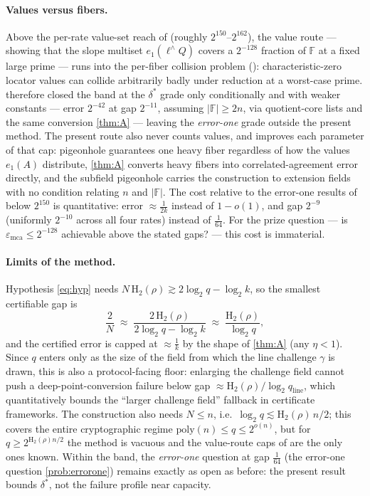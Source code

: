 \documentclass[11pt]{article}
\theoremstyle{definition}
\theoremstyle{remark}
\newcommand{\F}{\mathbb{F}}
\newcommand{\emca}{\varepsilon_{\mathrm{mca}}}
\newcommand{\Hb}{\mathrm{H}_2}
\newcommand{\eone}{e_1}
\begin{document}
\paragraph{Values versus fibers.}
Above the per-rate value-set reach of \cite{Cho26b} (roughly $2^{150}$--$2^{162}$), the value route --- showing that the slope multiset $\eone(\ell^\wedge Q)$ covers a $2^{-128}$ fraction of $\F$ at a fixed large prime --- runs into the per-fiber collision problem (\cite[Rem.\ ``The remaining band'']{Cho26b}): characteristic-zero locator values can collide arbitrarily badly under reduction at a worst-case prime. \cite{Cho26b} therefore closed the band at the $\delta^*$ grade only conditionally and with weaker constants --- error $2^{-42}$ at gap $2^{-11}$, assuming $|\F|\ge2n$, via quotient-core lists and the same conversion \cref{thm:A} --- leaving the \emph{error-one} grade outside the present method. The present route also never counts values, and improves each parameter of that cap: pigeonhole guarantees one heavy fiber regardless of how the values $\eone(A)$ distribute, \cref{thm:A} converts heavy fibers into correlated-agreement error directly, and the subfield pigeonhole carries the construction to extension fields with no condition relating $n$ and $|\F|$. The cost relative to the error-one results of \cite{Cho26a,Cho26b} below $2^{150}$ is quantitative: error $\approx\frac1{2k}$ instead of $1-o(1)$, and gap $2^{-9}$ (uniformly $2^{-10}$ across all four rates) instead of $\frac1{64}$. For the prize question --- is $\emca\le2^{-128}$ achievable above the stated gaps? --- this cost is immaterial.

\paragraph{Limits of the method.}
Hypothesis \eqref{eq:hyp} needs $N\,\Hb(\rho)\gtrsim2\log_2q-\log_2k$, so the smallest certifiable gap is
\[
\frac2N\;\approx\;\frac{2\,\Hb(\rho)}{2\log_2q-\log_2k}\;\approx\;\frac{\Hb(\rho)}{\log_2 q},
\]
and the certified error is capped at $\approx\frac1k$ by the shape of \cref{thm:A} (any $\eta<1$). Since $q$ enters only as the size of the field from which the line challenge $\gamma$ is drawn, this is also a protocol-facing floor: enlarging the challenge field cannot push a deep-point-conversion failure below gap $\approx\Hb(\rho)/\log_2 q_{\mathrm{line}}$, which quantitatively bounds the ``larger challenge field'' fallback in certificate frameworks. The construction also needs $N\le n$, i.e.\ $\log_2q\lesssim\Hb(\rho)\,n/2$; this covers the entire cryptographic regime $\mathrm{poly}(n)\le q\le2^{o(n)}$, but for $q\ge2^{\Hb(\rho)n/2}$ the method is vacuous and the value-route caps of \cite{Cho26a,Cho26b} are the only ones known. Within the band, the \emph{error-one} question at gap $\frac1{64}$ (the error-one question \cref{prob:errorone}) remains exactly as open as before: the present result bounds $\delta^*$, not the failure profile near capacity.
\end{document}
